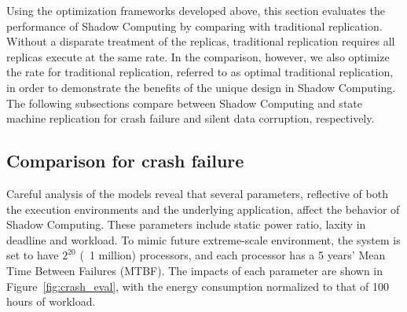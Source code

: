 Using the optimization frameworks developed above, this section evaluates the performance of Shadow Computing by comparing with traditional replication. Without a disparate treatment of the replicas, traditional replication requires all replicas execute at the same rate. In the comparison, however, we also optimize the rate for traditional replication, referred to as optimal traditional replication, in order to demonstrate the benefits of the unique design in Shadow Computing. The following subsections compare between Shadow Computing and state machine replication for crash failure and silent data corruption, respectively. 

\subsection{Comparison for crash failure}
Careful analysis of the models reveal that several parameters, reflective of both the execution environments and the underlying application, affect the behavior of Shadow Computing. These parameters include static power ratio, laxity in deadline and workload. To mimic future extreme-scale environment, the system is set to have $2^{20}$ (~1 million) processors, and each processor has a 5 years' Mean Time Between Failures (MTBF). The impacts of each parameter are shown in Figure~\ref{fig:crash_eval}, with the energy consumption normalized to that of 100 hours of workload.

